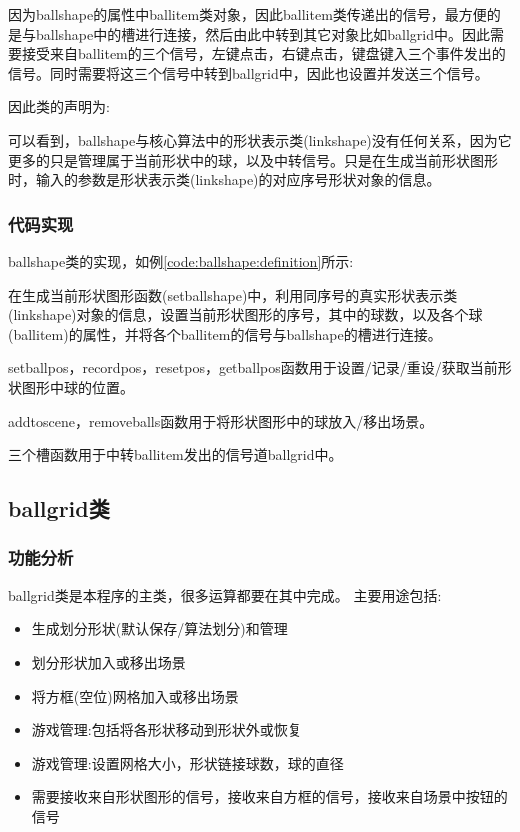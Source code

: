 \documentclass[11pt,twoside]{article} %
\begin{document}
因为ballshape的属性中ballitem类对象，因此ballitem类传递出的信号，最方便的是与ballshape中的槽进行连接，然后由此中转到其它对象比如ballgrid中。因此需要接受来自ballitem的三个信号，左键点击，右键点击，键盘键入三个事件发出的信号。同时需要将这三个信号中转到ballgrid中，因此也设置并发送三个信号。

因此类的声明为:

可以看到，ballshape与核心算法中的形状表示类(linkshape)没有任何关系，因为它更多的只是管理属于当前形状中的球，以及中转信号。只是在生成当前形状图形时，输入的参数是形状表示类(linkshape)的对应序号形状对象的信息。


\subsubsection{代码实现}
ballshape类的实现，如例\ref{code:ballshape:definition}所示:

在生成当前形状图形函数(setballshape)中，利用同序号的真实形状表示类(linkshape)对象的信息，设置当前形状图形的序号，其中的球数，以及各个球(ballitem)的属性，并将各个ballitem的信号与ballshape的槽进行连接。

setballpos，recordpos，resetpos，getballpos函数用于设置/记录/重设/获取当前形状图形中球的位置。

addtoscene，removeballs函数用于将形状图形中的球放入/移出场景。

三个槽函数用于中转ballitem发出的信号道ballgrid中。



\subsection{ballgrid类}

\subsubsection{功能分析}

ballgrid类是本程序的主类，很多运算都要在其中完成。
主要用途包括:
\begin{itemize}
  \item 生成划分形状(默认保存/算法划分)和管理
  \item 划分形状加入或移出场景
  \item 将方框(空位)网格加入或移出场景
  \item 游戏管理:包括将各形状移动到形状外或恢复
  \item 游戏管理:设置网格大小，形状链接球数，球的直径
  \item 需要接收来自形状图形的信号，接收来自方框的信号，接收来自场景中按钮的信号
\end{itemize}
\end{document}
